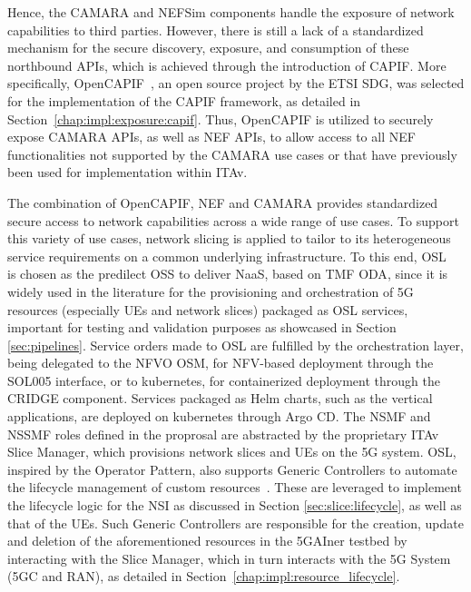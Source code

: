 Hence, the CAMARA and NEFSim components handle the exposure of network capabilities to third parties. However, there is still a lack of a standardized mechanism for the secure discovery, exposure, and consumption of these northbound \acsp{API}, which is achieved through the introduction of \acs{CAPIF}. More specifically, OpenCAPIF~\cite{OpenCAPIF}, an open source project by the \acs{ETSI} \acs{SDG}, was selected for the implementation of the \acs{CAPIF} framework, as detailed in Section~\ref{chap:impl:exposure:capif}. Thus, OpenCAPIF is utilized to securely expose CAMARA \acsp{API}, as well as \acs{NEF} \acsp{API}, to allow access to all \acs{NEF} functionalities not supported by the CAMARA use cases or that have previously been used for implementation within \acs{ITAv}.

The combination of OpenCAPIF, \acs{NEF} and CAMARA provides standardized secure access to network capabilities across a wide range of use cases. To support this variety of use cases, network slicing is applied to tailor to its heterogeneous service requirements on a common underlying infrastructure. To this end, \acf{OSL}~\cite{OpenSlice} is chosen as the predilect \acs{OSS} to deliver \acs{NaaS}, based on \acs{TMF} \acs{ODA}, since it is widely used in the literature for the provisioning and orchestration of \acs{5G} resources (especially \acsp{UE} and network slices) packaged as \acs{OSL} services, important for testing and validation purposes as showcased in Section \ref{sec:pipelines}. Service orders made to \acs{OSL} are fulfilled by the orchestration layer, being delegated to the \acs{NFVO} \acs{OSM}, for \acs{NFV}-based deployment through the SOL005 interface, or to kubernetes, for containerized deployment through the CRIDGE component. Services packaged as Helm charts, such as the vertical applications, are deployed on kubernetes through Argo CD. The \acs{NSMF} and \acs{NSSMF} roles defined in the proprosal are abstracted by the proprietary \acs{ITAv} Slice Manager, which provisions network slices and \acsp{UE} on the \acs{5G} system. \acs{OSL}, inspired by the Operator Pattern, also supports Generic Controllers to automate the lifecycle management of custom resources~\cite{OpenSliceGenericServicesController}. These are leveraged to implement the lifecycle logic for the \acs{NSI} as discussed in Section \ref{sec:slice:lifecycle}, as well as that of the \acsp{UE}. Such Generic Controllers are responsible for the creation, update and deletion of the aforementioned resources in the 5GAIner testbed by interacting with the Slice Manager, which in turn interacts with the \acs{5G} System (\acs{5GC} and \acs{RAN}), as detailed in Section~\ref{chap:impl:resource_lifecycle}.

